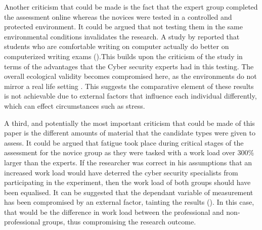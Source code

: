 Another criticism that could be made is the fact that the expert group completed the assessment online whereas the novices were tested in a controlled and protected environment. It could be argued that not testing them in the same environmental conditions invalidates the research. A study by \citeauthor{russell2003computer} reported that students who are comfortable writing on computer actually do better on computerized writing exams (\cite{russell2003computer}).This builds upon the criticism of the study in terms of the advantages that the Cyber security experts had in this testing. The overall ecological validity becomes compromised here, as the environments do not mirror a real life setting \cite{bryman_2016}. This suggests the comparative element of these results is not achievable due to external factors that influence each individual differently, which can effect circumstances such as stress.

A third, and potentially the most important criticism that could be made of this paper is the different amounts of material that the candidate types were given to assess. It could be argued that fatigue took place during critical stages of the assessment for the novice group as they were tasked with a work load over 300\% larger than the experts. If the researcher was correct in his assumptions that an increased work load would have deterred the cyber security specialists from participating in the experiment, then the work load of both groups should have been equalised. It can be suggested that the dependant variable of measurement has been compromised by an external factor, tainting the results (\cite{bryman_2016}). In this case, that would be the difference in work load between the professional and non-professional groups, thus compromising the research outcome.

